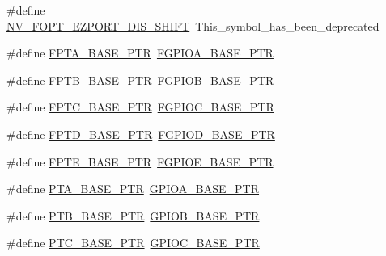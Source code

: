 \begin{DoxyCompactItemize}
\item 
\#define \hyperlink{group___backward___compatibility___symbols_gabf1111ccacc4104b2855c4f3851cbaa5}{N\+V\+\_\+\+F\+O\+P\+T\+\_\+\+E\+Z\+P\+O\+R\+T\+\_\+\+D\+I\+S\+\_\+\+S\+H\+I\+FT}~This\+\_\+symbol\+\_\+has\+\_\+been\+\_\+deprecated
\item 
\#define \hyperlink{group___backward___compatibility___symbols_ga4b0d89f517528ab7c1d2fdefe4c863d8}{F\+P\+T\+A\+\_\+\+B\+A\+S\+E\+\_\+\+P\+TR}~\hyperlink{group___f_g_p_i_o___peripheral_gab3a191da68ebf432fd4f94966600d287}{F\+G\+P\+I\+O\+A\+\_\+\+B\+A\+S\+E\+\_\+\+P\+TR}
\item 
\#define \hyperlink{group___backward___compatibility___symbols_ga725ec21a43213bffe0aa484f7406bcf5}{F\+P\+T\+B\+\_\+\+B\+A\+S\+E\+\_\+\+P\+TR}~\hyperlink{group___f_g_p_i_o___peripheral_gab93f90411688e9bf030a19bda18ba512}{F\+G\+P\+I\+O\+B\+\_\+\+B\+A\+S\+E\+\_\+\+P\+TR}
\item 
\#define \hyperlink{group___backward___compatibility___symbols_gaed3b8398ebed63795f9ce57eb9a59097}{F\+P\+T\+C\+\_\+\+B\+A\+S\+E\+\_\+\+P\+TR}~\hyperlink{group___f_g_p_i_o___peripheral_ga6e8da1b292ae2db0692bbb91a63eb0cc}{F\+G\+P\+I\+O\+C\+\_\+\+B\+A\+S\+E\+\_\+\+P\+TR}
\item 
\#define \hyperlink{group___backward___compatibility___symbols_gabaff6b055edb9ba703415d0473b92ca8}{F\+P\+T\+D\+\_\+\+B\+A\+S\+E\+\_\+\+P\+TR}~\hyperlink{group___f_g_p_i_o___peripheral_ga9c6c1b7ee627c12dd837efcb09e23d15}{F\+G\+P\+I\+O\+D\+\_\+\+B\+A\+S\+E\+\_\+\+P\+TR}
\item 
\#define \hyperlink{group___backward___compatibility___symbols_ga191ce600c147c06111ecea5b3b0aa6fb}{F\+P\+T\+E\+\_\+\+B\+A\+S\+E\+\_\+\+P\+TR}~\hyperlink{group___f_g_p_i_o___peripheral_ga07d1ba914f3ded63431edec77d4544ee}{F\+G\+P\+I\+O\+E\+\_\+\+B\+A\+S\+E\+\_\+\+P\+TR}
\item 
\#define \hyperlink{group___backward___compatibility___symbols_gadf98f6ee2bbfd42102e378a66b29b9ef}{P\+T\+A\+\_\+\+B\+A\+S\+E\+\_\+\+P\+TR}~\hyperlink{group___g_p_i_o___peripheral_ga3a8bd75d8b47b51132005ce9bbcbab7f}{G\+P\+I\+O\+A\+\_\+\+B\+A\+S\+E\+\_\+\+P\+TR}
\item 
\#define \hyperlink{group___backward___compatibility___symbols_ga59ab0f28e891ea28f152505ce2021747}{P\+T\+B\+\_\+\+B\+A\+S\+E\+\_\+\+P\+TR}~\hyperlink{group___g_p_i_o___peripheral_ga3f4701cf222c28bfdcc2768a296b4171}{G\+P\+I\+O\+B\+\_\+\+B\+A\+S\+E\+\_\+\+P\+TR}
\item 
\#define \hyperlink{group___backward___compatibility___symbols_gaaa3dc05c2a51a960067e1de6863fd3dd}{P\+T\+C\+\_\+\+B\+A\+S\+E\+\_\+\+P\+TR}~\hyperlink{group___g_p_i_o___peripheral_ga39b26484b0ad91fdbf93e27aa6ee7571}{G\+P\+I\+O\+C\+\_\+\+B\+A\+S\+E\+\_\+\+P\+TR}

\end{DoxyCompactItemize}
